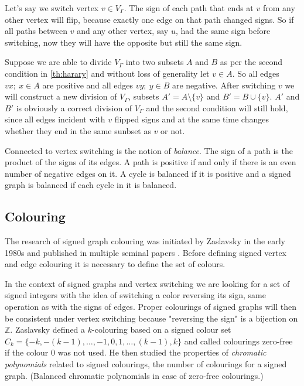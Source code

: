 Let's say we switch vertex $v \in V_{\Gamma}$. The sign of each path that ends at $v$ from any other vertex will flip, because exactly one edge on that path changed signs. So if all paths between $v$ and any other vertex, say $u$, had the same sign before switching, now they will have the opposite but still the same sign.

Suppose we are able to divide $V_{\Gamma}$ into two subsets $A$ and $B$ as per the second condition in \cref*{th:harary} and without loss of generality let $v \in A$. So all edges $vx; ~ x \in A$ are positive and all edges $vy; ~ y \in B$ are negative. After switching $v$ we will construct a new division of $V_{\Gamma}$, subsets $A' = A \setminus \{v\}$ and $B' = B \cup \{v\}$. $A'$ and $B'$ is obviously a correct division of $V_{\Gamma}$ and the second condition will still hold, since all edges incident with $v$ flipped signs and at the same time changes whether they end in the same sunbset as $v$ or not.

Connected to vertex switching is the notion of \textit{balance}. The sign of a path is the product of the signs of its edges. A path is positive if and only if there is an even number of negative edges on it. A cycle is balanced if it is positive and a signed graph is balanced if each cycle in it is balanced\cite{harary}.

\subsection{Colouring}

The research of signed graph colouring was initiated by Zaslavsky\cite{zaslavsky-graphs} in the early 1980s and published in multiple seminal papers \cite{zaslavsky-invariants,zaslavsky-colouring,zaslavsky-colourful}. Before defining signed vertex and edge colouring it is necessary to define the set of colours.

In the context of signed graphs and vertex switching we are looking for a set of signed integers with the idea of switching a color reversing its sign, same operation as with the signs of edges. Proper colourings of signed graphs will then be consistent under vertex switching because "reversing the sign" is a bijection on $\mathbb{Z}$. Zaslavsky \cite{zaslavsky-colouring} defined a $k$-colouring based on a signed colour set $C_k = \{-k, -(k-1), \dots, -1, 0, 1, \dots, (k-1), k\}$ and called colourings zero-free if the colour $0$ was not used. He then studied the properties of \textit{chromatic polynomials} related to signed colourings, the number of colourings for a signed graph. (Balanced chromatic polynomials in case of zero-free colourings.)

